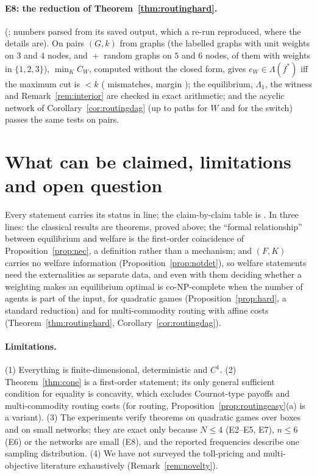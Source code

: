 \documentclass[11pt,a4paper]{article}
\theoremstyle{plain}
\theoremstyle{definition}
\theoremstyle{remark}
\newcommand{\Lam}{\Lambda}
\newcommand{\Lone}{\Lambda_{1}}
\begin{document}
\paragraph{E8: the reduction of Theorem~\ref{thm:routinghard}.} \CritRouting{} (; numbers parsed from its saved output, which a re-run reproduced, where the details are). On \RtPairs{} pairs $(G,k)$ from \RtGraphs{} graphs (the \RtAllLabelled{} labelled graphs with unit weights on $3$ and $4$ nodes, and \RtRandFive{}${}+{}$\RtRandSix{} random graphs on $5$ and $6$ nodes, \RtRandWeighted{} of them with weights in $\{1,2,3\}$), $\min_KC_W$, computed without the closed form, gives $e_W\in\Lam(f^*)$ iff the maximum cut is $<k$ (\RtMism{} mismatches, margin \RtMargin); the equilibrium, $\Lone$, the witness and Remark~\ref{rem:interior} are checked in exact arithmetic; and the acyclic network of Corollary~\ref{cor:routingdag} (up to \RtDagMaxPathsW{} paths for $W$ and \RtDagMaxPathsZ{} for the switch) passes the same tests on \RtDagPairs{} pairs.
\fi


\section{What can be claimed, limitations and open question}\label{sec:claims}\label{sec:limits}

Every statement carries its status in line; the claim-by-claim table is . In three lines: the classical results are theorems, proved above; the ``formal relationship'' between equilibrium and welfare is the first-order coincidence of Proposition~\ref{prop:nec}, a definition rather than a mechanism; and $(F,K)$ carries no welfare information (Proposition~\ref{prop:notdet}), so welfare statements need the externalities as separate data, and even with them deciding whether a weighting makes an equilibrium optimal is co-NP-complete when the number of agents is part of the input, for quadratic games (Proposition~\ref{prop:hard}, a standard reduction) and for multi-commodity routing with affine costs (Theorem~\ref{thm:routinghard}, Corollary~\ref{cor:routingdag}).

\paragraph{Limitations.}
(1) Everything is finite-dimensional, deterministic and $C^1$. (2) Theorem~\ref{thm:cone} is a first-order statement; its only general sufficient condition for equality is concavity, which excludes Cournot-type payoffs and multi-commodity routing costs (for routing, Proposition~\ref{prop:routingeasy}(a) is a variant). (3) The experiments verify theorems on quadratic games over boxes and on small networks; they are exact only because $N\le4$ (E2--E5, E7), $n\le6$ (E6) or the networks are small (E8), and the reported frequencies describe one sampling distribution. (4) We have not surveyed the toll-pricing and multi-objective literature exhaustively (Remark~\ref{rem:novelty}).
\end{document}
